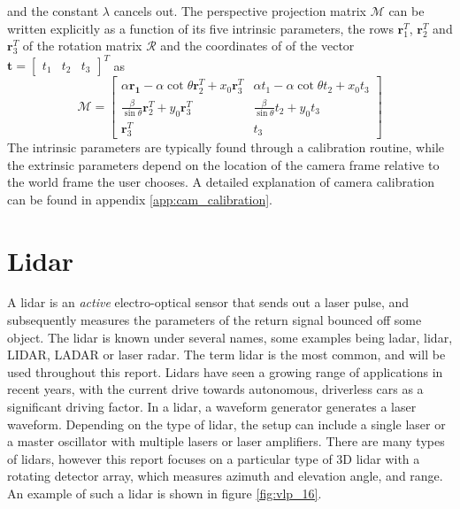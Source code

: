 and the constant $\lambda$ cancels out. The perspective projection matrix $\mathcal{M}$ can be written explicitly as a function of its five intrinsic parameters, the rows $\mathbf{r}_1^T$, $\mathbf{r}_2^T$ and $\mathbf{r}_3^T$ of the rotation matrix $\mathcal{R}$ and the coordinates of of the vector $\mathbf{t}=\begin{bmatrix}t_1 & t_2 & t_3\end{bmatrix}^T$ as 
\begin{equation}
    \mathcal{M}=\begin{bmatrix}\alpha\mathbf{r_1}-\alpha\cot{\theta}\mathbf{r}_2^T+x_0\mathbf{r}_3^T & \alpha t_1-\alpha\cot{\theta}t_2+x_0t_3\\ \frac{\beta}{\sin{\theta}}\mathbf{r}_2^T + y_0\mathbf{r}_3^T & \frac{\beta}{\sin{\theta}}t_2+y_0t_3 \\
    \mathbf{r}_3^T & t_3\end{bmatrix}
\end{equation}
The intrinsic parameters are typically found through a calibration routine, while the extrinsic parameters depend on the location of the camera frame relative to the world frame the user chooses. A detailed explanation of camera calibration can be found in appendix \ref{app:cam_calibration}.
\section{Lidar}
A lidar is an \textit{active} electro-optical sensor that sends out a laser pulse, and subsequently measures the parameters of the return signal bounced off some object. The lidar is known under several names, some examples being ladar, lidar, LIDAR, LADAR or laser radar. The term lidar is the most common, and will be used throughout this report. Lidars have seen a growing range of applications in recent years, with the current drive towards autonomous, driverless cars as a significant driving factor. In a lidar, a waveform generator generates a laser waveform. Depending on the type of lidar, the setup can include a single laser or a master oscillator with multiple lasers or laser amplifiers. There are many types of lidars, however this report focuses on a particular type of 3D lidar with a rotating detector array, which measures azimuth and elevation angle, and range. An example of such a lidar is shown in figure \ref{fig:vlp_16}. 


